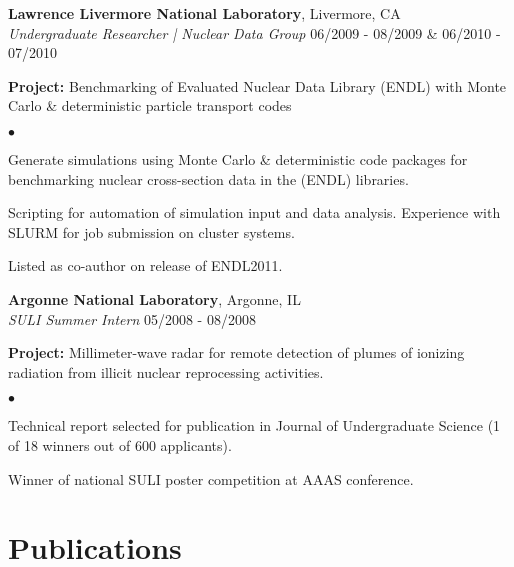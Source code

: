 \documentclass[margin,line]{res}
\let\resumesection\section
\newenvironment{list1}{
  \begin{list}{\ding{113}}{%
      \setlength{\itemsep}{0in}
      \setlength{\parsep}{0in} \setlength{\parskip}{0in}
      \setlength{\topsep}{0in} \setlength{\partopsep}{0in} 
      \setlength{\leftmargin}{0.17in}}}{\end{list}}
\newenvironment{list2}{
  \begin{list}{$\bullet$}{%
      \setlength{\itemsep}{0in}
      \setlength{\parsep}{0in} \setlength{\parskip}{0in}
      \setlength{\topsep}{0in} \setlength{\partopsep}{0in} 
      \setlength{\leftmargin}{0.2in}}}{\end{list}}
\begin{document}
\begin{resume}
{\bf Lawrence Livermore National Laboratory}, Livermore, CA \\ 
{\em Undergraduate Researcher | Nuclear Data Group} \hfill 06/2009 - 08/2009 \& 06/2010 - 07/2010

\begin{list1}
  \item[] {\bf \small Project:} Benchmarking of Evaluated Nuclear Data Library
                                (ENDL) with Monte Carlo \& deterministic
                                particle transport codes
  \begin{list2}
    \item Generate simulations using Monte Carlo \& deterministic code packages
          for benchmarking nuclear cross-section data in the (ENDL) libraries.
    \item Scripting for automation of simulation input and data analysis.
          Experience with SLURM for job submission on cluster systems.
    \item Listed as co-author on release of ENDL2011.
  \end{list2}
\end{list1}

{\bf Argonne National Laboratory}, Argonne, IL \\ 
{\em SULI Summer Intern} \hfill 05/2008 - 08/2008

\begin{list1}
  \item[] {\bf \small Project:} Millimeter-wave radar for remote detection of
                                plumes of ionizing radiation from illicit
                                nuclear reprocessing activities.
  \begin{list2}
    \item Technical report selected for publication in Journal of Undergraduate
            Science (1 of 18 winners out of 600 applicants).
    \item Winner of national SULI poster competition at AAAS conference.
  \end{list2}
\end{list1}

\section{\sc Publications}

\renewcommand{\section}[2]{}
\renewcommand{\section}{\resumesection}


\end{resume}
\end{document}
